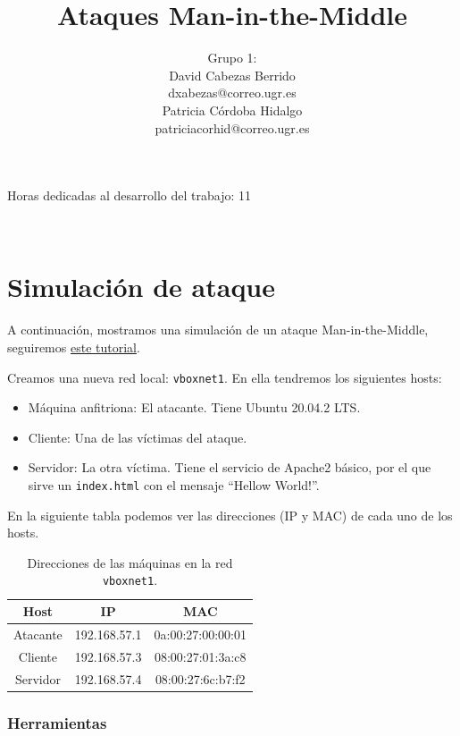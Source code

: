 \documentclass[11pt]{article}
\title{\Huge Ataques Man-in-the-Middle \vspace{10mm}}
\author{\Large Grupo 1: \vspace{10mm} \\
	\Large David Cabezas Berrido \vspace{5mm} \\ 
  \Large dxabezas@correo.ugr.es \vspace{10mm} \\
  \Large Patricia Córdoba Hidalgo \vspace{5mm} \\ 
	\Large patriciacorhid@correo.ugr.es \vspace{10mm}}
\begin{document}
\maketitle
\vfill
\begin{flushleft}
{\Large Horas dedicadas al desarrollo del trabajo: 11}
\end{flushleft}
\vspace{40mm}
~
\newpage
\tableofcontents
\newpage

\section{Simulación de ataque}

A continuación, mostramos una simulación de un ataque Man-in-the-Middle, seguiremos
\href{https://www.youtube.com/watch?v=fbXu8EX0hsI}{este tutorial}. 

Creamos una nueva red local: \texttt{vboxnet1}. En ella tendremos los siguientes hosts:
\begin{itemize}
	\item Máquina anfitriona: El atacante. Tiene Ubuntu 20.04.2 LTS.
	\item Cliente: Una de las víctimas del ataque.
	\item Servidor: La otra víctima. Tiene el servicio de Apache2 básico, por el que sirve un \texttt{index.html} con el mensaje
	``Hellow World!''.
\end{itemize}

En la siguiente tabla podemos ver las direcciones (IP y MAC) de cada uno de los hosts.

\begin{table}[H]
	\centering
	\begin{tabular}{|c|c|c|}
		\hline
		\textbf{Host} & \textbf{IP}  & \textbf{MAC}      \\ \hline
		Atacante      & 192.168.57.1 & 0a:00:27:00:00:01 \\ \hline
		Cliente       & 192.168.57.3 & 08:00:27:01:3a:c8 \\ \hline
		Servidor      & 192.168.57.4 & 08:00:27:6c:b7:f2 \\ \hline
	\end{tabular}
	\caption{Direcciones de las máquinas en la red \texttt{vboxnet1}.}
	\label{tab:info-hosts}
\end{table}

\subsubsection*{Herramientas}
\end{document}
